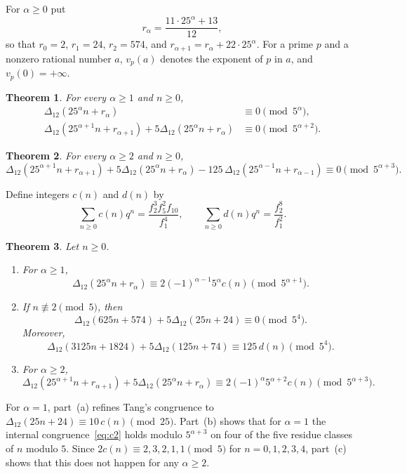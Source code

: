 \documentclass[11pt]{article}
\newtheorem{theorem}{Theorem}[section]
\theoremstyle{definition}
\theoremstyle{remark}
\numberwithin{equation}{section}
\begin{document}
For $\alpha\ge0$ put
\[
r_\alpha=\frac{11\cdot25^\alpha+13}{12},
\]
so that $r_0=2$, $r_1=24$, $r_2=574$, and $r_{\alpha+1}=r_\alpha+22\cdot25^\alpha$. For a prime $p$ and a nonzero rational number $a$, $v_p(a)$ denotes the exponent of $p$ in $a$, and $v_p(0)=+\infty$.

\begin{theorem}\label{thm:main}
For every $\alpha\ge1$ and $n\ge0$,
\begin{align}
\Delta_{12}(25^\alpha n+r_\alpha)&\equiv0\pmod{5^\alpha},\label{eq:c1}\\
\Delta_{12}(25^{\alpha+1}n+r_{\alpha+1})+5\Delta_{12}(25^\alpha n+r_\alpha)&\equiv0\pmod{5^{\alpha+2}}.\label{eq:c2}
\end{align}
\end{theorem}

\begin{theorem}\label{thm:second}
For every $\alpha\ge2$ and $n\ge0$,
\begin{equation}\label{eq:c3}
\Delta_{12}(25^{\alpha+1}n+r_{\alpha+1})+5\Delta_{12}(25^\alpha n+r_\alpha)-125\,\Delta_{12}(25^{\alpha-1}n+r_{\alpha-1})\equiv0\pmod{5^{\alpha+3}}.
\end{equation}
\end{theorem}

Define integers $c(n)$ and $d(n)$ by
\begin{equation}\label{eq:cd}
\sum_{n\ge0}c(n)q^n=\frac{f_2^3f_5^2f_{10}}{f_1^4},\qquad\sum_{n\ge0}d(n)q^n=\frac{f_2^8}{f_1^2}.
\end{equation}

\begin{theorem}\label{thm:next}
Let $n\ge0$.
\begin{enumerate}[label=\textup{(\alph*)}]
\item For $\alpha\ge1$,
\[
\Delta_{12}(25^\alpha n+r_\alpha)\equiv2(-1)^{\alpha-1}5^\alpha c(n)\pmod{5^{\alpha+1}}.
\]
\item If $n\not\equiv2\pmod5$, then
\[
\Delta_{12}(625n+574)+5\Delta_{12}(25n+24)\equiv0\pmod{5^4}.
\]
Moreover,
\[
\Delta_{12}(3125n+1824)+5\Delta_{12}(125n+74)\equiv125\,d(n)\pmod{5^4}.
\]
\item For $\alpha\ge2$,
\[
\Delta_{12}(25^{\alpha+1}n+r_{\alpha+1})+5\Delta_{12}(25^\alpha n+r_\alpha)\equiv2(-1)^\alpha5^{\alpha+2}c(n)\pmod{5^{\alpha+3}}.
\]
\end{enumerate}
\end{theorem}

For $\alpha=1$, part~(a) refines Tang's congruence to $\Delta_{12}(25n+24)\equiv10\,c(n)\pmod{25}$. Part~(b) shows that for $\alpha=1$ the internal congruence~\eqref{eq:c2} holds modulo $5^{\alpha+3}$ on four of the five residue classes of $n$ modulo $5$. Since $2c(n)\equiv2,3,2,1,1\pmod5$ for $n=0,1,2,3,4$, part~(c) shows that this does not happen for any $\alpha\ge2$.
\end{document}
